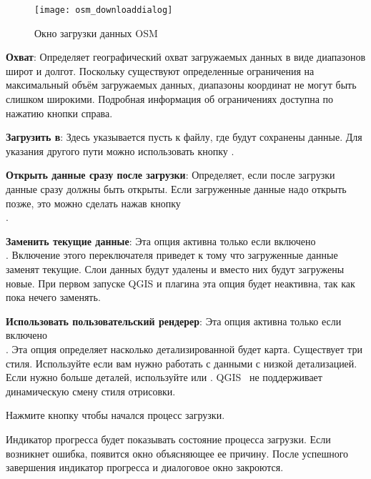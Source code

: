 \begin{figure}[ht]
   \centering
   \texttt{[image: osm\_downloaddialog]}
   \caption{Окно загрузки данных OSM \nixcaption}\label{fig:osmdownload}
\end{figure}

\begin{description}
\item \textbf{Охват}: Определяет географический охват загружаемых
данных в виде диапазонов широт и долгот. Поскольку существуют
определенные ограничения на максимальный объём загружаемых данных,
диапазоны координат не могут быть слишком широкими. Подробная информация
об ограничениях доступна по нажатию кнопки
 справа.
\item \textbf{Загрузить в}: Здесь указывается пусть к файлу, где будут
сохранены данные. Для указания другого пути можно использовать кнопку
.
\item \textbf{Открыть данные сразу после загрузки}: Определяет, если
после загрузки данные сразу должны быть открыты. Если загруженные данные
надо открыть позже, это можно сделать нажав кнопку \\
.
\item \textbf{Заменить текущие данные}: Эта опция активна только если
включено \\
. Включение этого
переключателя приведет к тому что загруженные данные заменят текущие.
Слои данных будут удалены и вместо них будут загружены новые. При первом
запуске QGIS и плагина эта опция будет неактивна, так как пока нечего
заменять.
\item \textbf{Использовать пользовательский рендерер}: Эта опция
активна только если включено \\
. Эта опция
определяет насколько детализированной будет карта. Существует три стиля.
Используйте  если вам нужно работать с данными
с низкой детализацией. Если нужно больше деталей, используйте
 или . QGIS~\CURRENT
не поддерживает динамическую смену стиля отрисовки.
\end{description}

Нажмите кнопку  чтобы начался процесс загрузки.

Индикатор прогресса будет показывать состояние процесса загрузки. Если
возникнет ошибка, появится окно объясняющее ее причину. После успешного
завершения индикатор прогресса и диалоговое окно закроются.

